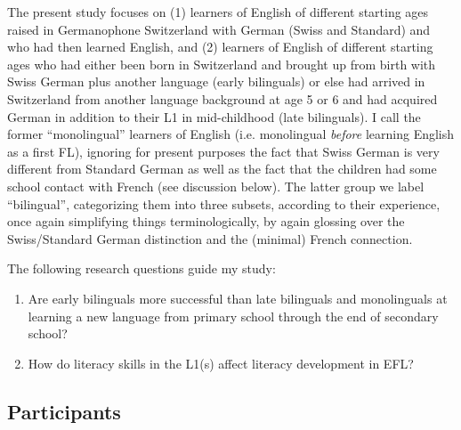 \documentclass[output=paper,modfonts,nonflat,newtxmath]{langsci/langscibook}
\begin{document}
The present study focuses on (1) learners of English of different starting ages raised in Germanophone Switzerland with German (Swiss and Standard) and who had then learned English, and (2) learners of English of different starting ages who had either been born in Switzerland and brought up from birth with Swiss German plus another language (early bilinguals) or else had arrived in Switzerland from another language background at age 5 or 6 and had acquired German in addition to their L1 in mid-childhood (late bilinguals). I call the former “monolingual” learners of English (i.e. monolingual \textit{before} learning English as a first FL), ignoring for present purposes the fact that Swiss German is very different from Standard German as well as the fact that the children had some school contact with French (see discussion below). The latter group we label “bilingual”, categorizing them into three subsets, according to their experience, once again simplifying things terminologically, by again glossing over the Swiss/Standard German distinction and the (minimal) French connection.

The following research questions guide my study:

\begin{enumerate}
\item
Are early bilinguals more successful than late bilinguals and monolinguals at learning a new language from primary school through the end of secondary school?

\item
How do literacy skills in the L1(s) affect literacy development in EFL?

\end{enumerate}

\subsection{Participants}
\label{sec:pfenninger:3.2.}
\end{document}
